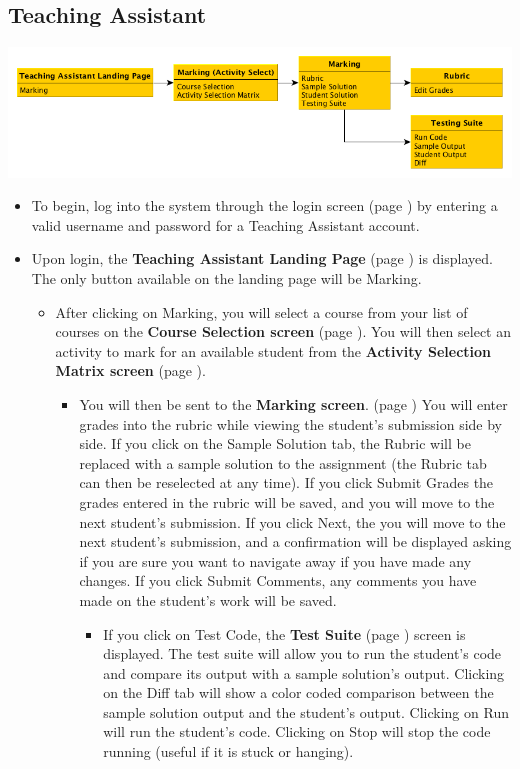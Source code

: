 \documentclass{article}
\begin{document}
\subsection{Teaching Assistant}
\centerline{\includegraphics[scale=.6]{../images/UIMockups/pngs/teachingAsst}}
\begin{itemize}
  \item To begin, log into the system through the login screen (page \pageref{login})
    by entering a valid username and password for a Teaching Assistant account.
  \item Upon login, the \textbf{Teaching Assistant Landing Page} (page \pageref{landPg}) 
  	is displayed. The only button available on the landing page will be Marking.
    \begin{itemize}
      \item After clicking on Marking, you will select a course from your list of courses
	on the \textbf{Course Selection screen} (page \pageref{courseSel}). You will then select an activity
	to mark for an available student from the \textbf{Activity Selection Matrix
	  screen} (page \pageref{actSel}).
	\begin{itemize}
	  \item You will then be sent to the \textbf{Marking screen}. (page
	    \pageref{marking}) You will enter grades into the rubric while viewing 
	    the student's submission side by side. If you click on the Sample Solution 
	    tab, the Rubric will be replaced with a sample solution to the assignment 
	    (the Rubric tab can then be reselected at any time). If you click Submit 
	    Grades the grades entered in the rubric will be saved, and you will 
	    move to the next student's submission. If you click Next, the you will 
	    move to the next student's submission, and a confirmation will be displayed 
	    asking if you are sure you want to navigate away if you have made any 
	    changes. If you click Submit Comments, any comments you have made 
	    on the student's work will be saved.
	    \begin{itemize}
	      \item If you click on Test Code, the \textbf{Test Suite} (page 
		\pageref{testSuite}) screen is displayed. The test suite will allow you 
		to run the student's code and compare its output with a sample 
		solution's output. Clicking on the Diff tab will show a color coded 
		comparison between the sample solution output and the student's 
		output. Clicking on Run will run the student's code. Clicking on Stop 
		will stop the code running (useful if it is stuck or hanging).
	    \end{itemize}
	\end{itemize}
    \end{itemize}
\end{itemize}
\end{document}
